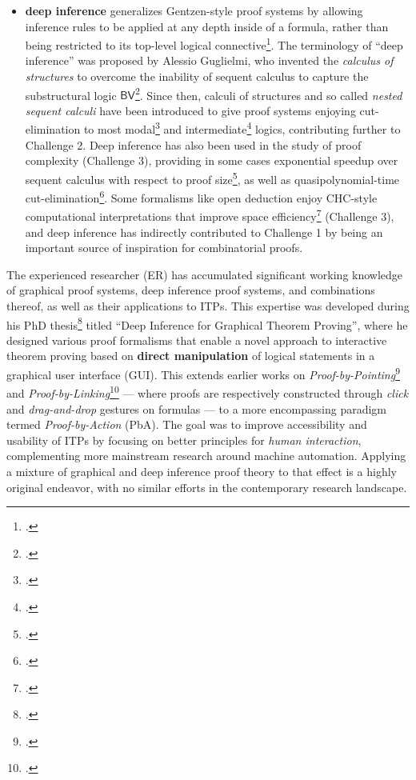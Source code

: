 \documentclass[12pt,draftproposal]{msca-pf}
\begin{document}
\begin{itemize}
    \item \textbf{deep inference} generalizes Gentzen-style proof systems by allowing inference
    rules to be applied at any depth inside of a formula, rather than being restricted to its
    top-level logical connective\footcite{tubella:hal-02390267}. The terminology of ``deep
    inference'' was proposed by Alessio Guglielmi, who invented the \emph{calculus of structures} to
    overcome the inability of sequent calculus to capture the substructural logic
    $\mathsf{BV}$\footcite{Guglielmi1999ACO}. Since then, calculi of structures and so called
    \emph{nested sequent calculi} have been introduced to give proof systems enjoying
    cut-elimination to most modal\footcite{kuznets_maehara-style_2019} and
    intermediate\footcite{postniece_proof_2010} logics, contributing further to Challenge 2. Deep
    inference has also been used in the study of proof complexity (Challenge 3), providing in some
    cases exponential speedup over sequent calculus with respect to proof
    size\footcite{dasRelativeProofComplexity2015a}, as well as quasipolynomial-time
    cut-elimination\footcite{bruscoliQuasipolynomialNormalisationDeep2016a}. Some formalisms like
    open deduction enjoy CHC-style computational interpretations that improve space
    efficiency\footcite{gundersenAtomicLambdaCalculus2013} (Challenge 3), and deep inference has
    indirectly contributed to Challenge 1 by being an important source of inspiration for
    combinatorial proofs.
\end{itemize}

The experienced researcher (ER) has accumulated significant working knowledge of graphical proof
systems, deep inference proof systems, and combinations thereof, as well as their applications to
ITPs. This expertise was developed during his PhD thesis\footcite{donatoDeepInferenceGraphical2024}
titled ``Deep Inference for Graphical Theorem Proving'', where he designed various proof formalisms
that enable a novel approach to interactive theorem proving based on \textbf{direct manipulation} of
logical statements in a graphical user interface (GUI). This extends earlier works on
\emph{Proof-by-Pointing}\footcite{PbP} and \emph{Proof-by-Linking}\footcite{Chaudhuri2013} --- where
proofs are respectively constructed through \emph{click} and \emph{drag-and-drop} gestures on
formulas --- to a more encompassing paradigm termed \emph{Proof-by-Action} (PbA). The goal was to
improve accessibility and usability of ITPs by focusing on better principles for \emph{human
interaction}, complementing more mainstream research around machine automation. Applying a mixture
of graphical and deep inference proof theory to that effect is a highly original endeavor, with no
similar efforts in the contemporary research landscape.
\end{document}
